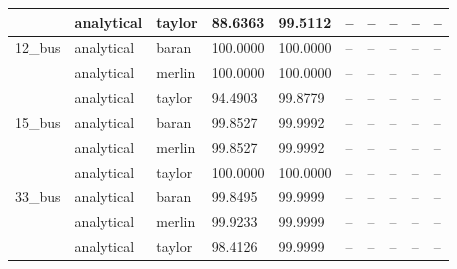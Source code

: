 \begin{table}[ht]
\begin{tabular}{llllllllll}
\rowcolor{gray!10}
 & analytical & taylor & 88.6363 & 99.5112 & – & – & – & – & – \\
\midrule
\rowcolor{gray!10}
12\_bus & analytical & baran & 100.0000 & 100.0000 & – & – & – & – & – \\
\rowcolor{gray!10}
 & analytical & merlin & 100.0000 & 100.0000 & – & – & – & – & – \\
\rowcolor{gray!10}
 & analytical & taylor & 94.4903 & 99.8779 & – & – & – & – & – \\
\midrule
\rowcolor{gray!10}
15\_bus & analytical & baran & 99.8527 & 99.9992 & – & – & – & – & – \\
\rowcolor{gray!10}
 & analytical & merlin & 99.8527 & 99.9992 & – & – & – & – & – \\
\rowcolor{gray!10}
 & analytical & taylor & 100.0000 & 100.0000 & – & – & – & – & – \\
\midrule
\rowcolor{gray!10}
33\_bus & analytical & baran & 99.8495 & 99.9999 & – & – & – & – & – \\
\rowcolor{gray!10}
 & analytical & merlin & 99.9233 & 99.9999 & – & – & – & – & – \\
\rowcolor{gray!10}
 & analytical & taylor & 98.4126 & 99.9999 & – & – & – & – & – \\
\bottomrule
\end{tabular}
\end{table}